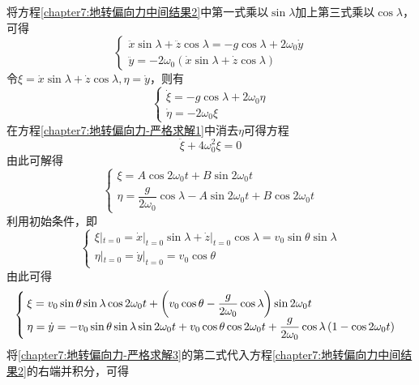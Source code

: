 将方程\eqref{chapter7:地转偏向力中间结果2}中第一式乘以$\sin\lambda$加上第三式乘以$\cos\lambda$，可得
\begin{equation*}
\begin{cases}
	\ddot{x}\sin\lambda+\ddot{z}\cos\lambda = -g\cos\lambda + 2\omega_0 \dot{y} \\
	\ddot{y} = -2\omega_0(\dot{x}\sin\lambda+\dot{z}\cos\lambda)
\end{cases}
\end{equation*}
令$\xi = \dot{x}\sin\lambda+\dot{z}\cos\lambda, \eta = \dot{y}$，则有
\begin{equation}
\begin{cases}
	\dot{\xi} = -g\cos\lambda + 2\omega_0\eta \\
	\dot{\eta} = -2\omega_0\xi
\end{cases}
\label{chapter7:地转偏向力-严格求解1}
\end{equation}
在方程\eqref{chapter7:地转偏向力-严格求解1}中消去$\eta$可得方程
\begin{equation*}
	\ddot{\xi} + 4\omega_0^2 \xi = 0
\end{equation*}
由此可解得
\begin{equation}
\begin{cases}
	\xi = A\cos2\omega_0t+B\sin2\omega_0t \\
	\eta = \dfrac{g}{2\omega_0}\cos\lambda - A\sin 2\omega_0t+B\cos2\omega_0t
\end{cases}
\label{chapter7:地转偏向力-严格求解2}
\end{equation}
利用初始条件，即
\begin{equation*}
\begin{cases}
	\xi|_{t=0} = \dot{x}|_{t=0}\sin\lambda+\dot{z}|_{t=0}\cos\lambda = v_0\sin\theta\sin\lambda \\
	\eta|_{t=0} = \dot{y}|_{t=0} = v_0\cos\theta
\end{cases}
\end{equation*}
由此可得
\begin{equation}
\begin{cases}
	\displaystyle \xi = v_0\sin\theta\sin\lambda \cos2\omega_0t+\left(v_0\cos\theta-\frac{g}{2\omega_0}\cos\lambda\right)\sin2\omega_0t \\
	\displaystyle \eta = \dot{y} = -v_0\sin\theta\sin\lambda\sin2\omega_0t+v_0\cos\theta\cos2\omega_0t+\frac{g}{2\omega_0}\cos\lambda\left(1-\cos2\omega_0t\right)
\end{cases}
\label{chapter7:地转偏向力-严格求解3}
\end{equation}
将\eqref{chapter7:地转偏向力-严格求解3}的第二式代入方程\eqref{chapter7:地转偏向力中间结果2}的右端并积分，可得
